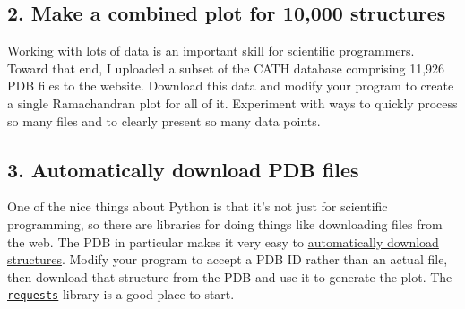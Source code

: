 \documentclass{article}
\newcommand{\module}[2]{\href{#2}{\texttt{#1}}}
\begin{document}
\subsection{2. Make a combined plot for 10,000 structures}

Working with lots of data is an important skill for scientific programmers.  
Toward that end, I uploaded a subset of the CATH database comprising 11,926 PDB 
files to the website.  Download this data and modify your program to create a 
single Ramachandran plot for all of it.  Experiment with ways to quickly 
process so many files and to clearly present so many data points.

\subsection{3. Automatically download PDB files}

One of the nice things about Python is that it's not just for scientific 
programming, so there are libraries for doing things like downloading files 
from the web.  The PDB in particular makes it very easy to 
\href{http://www.rcsb.org/pdb/software/rest.do#search}{automatically download 
structures}.  Modify your program to accept a PDB ID rather than an actual 
file, then download that structure from the PDB and use it to generate the 
plot.  The \module{requests}{http://docs.python-requests.org} library is a good 
place to start.
\end{document}
